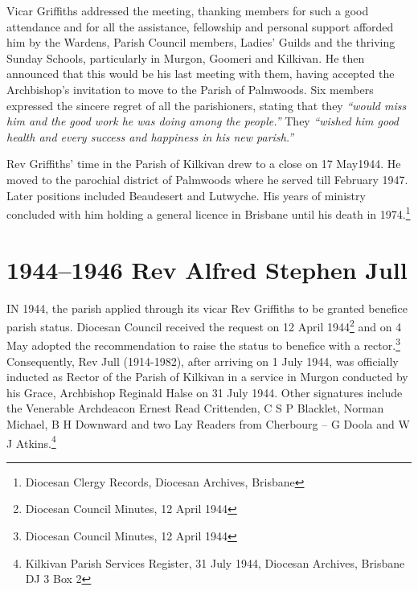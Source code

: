 Vicar Griffiths addressed the meeting, thanking members for such a good attendance and for all the assistance, fellowship and personal support afforded him by the Wardens, Parish Council members, Ladies' Guilds and the thriving Sunday Schools, particularly in Murgon, Goomeri and Kilkivan. He then announced that this would be his last meeting with them, having accepted the Archbishop's invitation to move to the Parish of Palmwoods. Six members expressed the sincere regret of all the parishioners, stating that they \emph{``would miss him and the good work he was doing among the people.''} They \emph{``wished him good health and every success and happiness in his new parish.''}



Rev Griffiths' time in the Parish of Kilkivan drew to a close on 17 May1944. He moved to the parochial district of Palmwoods where he served till February 1947. Later positions included Beaudesert and Lutwyche. His years of ministry concluded with him holding a general licence in Brisbane until his death in 1974.\footnote{Diocesan Clergy Records, Diocesan Archives, Brisbane}


\newpage


\printendnotes[custom]
\setcounter{endnote}{0}




\chapter{1944--1946 Rev Alfred Stephen Jull}
\nobalance


\lettrine[lines=3]{I}{N}
 1944, the parish applied through its vicar Rev Griffiths to be granted benefice parish status. Diocesan Council received the request on 12 April 1944\footnote{Diocesan Council Minutes, 12 April 1944} and on 4 May adopted the recommendation to raise the status to benefice with a rector.\footnote{Diocesan Council Minutes, 12 April 1944} Consequently, Rev Jull (1914-1982), after arriving on 1 July 1944, was officially inducted as Rector of the Parish of Kilkivan in a service in Murgon conducted by his Grace, Archbishop Reginald Halse on 31 July 1944. Other signatures include the Venerable Archdeacon Ernest Read Crittenden, C S P Blacklet, Norman Michael, B H Downward and two Lay Readers from Cherbourg -- G Doola and W J Atkins.\footnote{Kilkivan Parish Services Register, 31 July 1944, Diocesan Archives, Brisbane DJ 3 Box 2}







